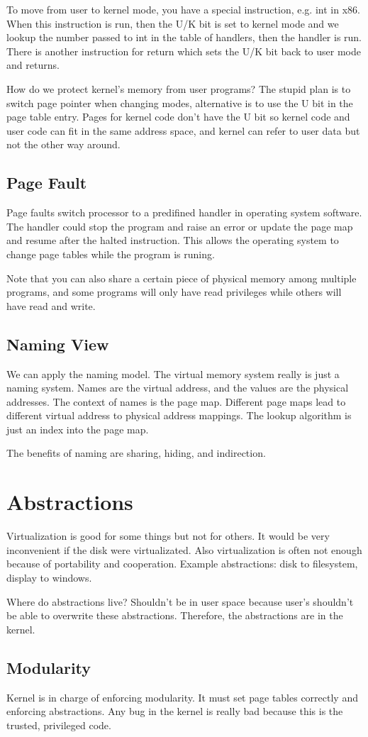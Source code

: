 \documentclass[psamsfonts]{amsart}
\begin{document}
To move from user to kernel mode, you have a special instruction, e.g. int in x86. When this instruction is run, then the U/K bit is set to kernel mode and we lookup the number passed to int in the table of handlers, then the handler is run. There is another instruction for return which sets the U/K bit back to user mode and returns.

How do we protect kernel's memory from user programs? The stupid plan is to switch page pointer when changing modes, alternative is to use the U bit in the page table entry. Pages for kernel code don't have the U bit so kernel code and user code can fit in the same address space, and kernel can refer to user data but not the other way around.

\subsection{Page Fault}

Page faults switch processor to a predifined handler in operating system software. The handler could stop the program and raise an error or update the page map and resume after the halted instruction. This allows the operating system to change page tables while the program is runing.

Note that you can also share a certain piece of physical memory among multiple programs, and some programs will only have read privileges while others will have read and write.

\subsection{Naming View}

We can apply the naming model. The virtual memory system really is just a naming system. Names are the virtual address, and the values are the physical addresses. The context of names is the page map. Different page maps lead to different virtual address to physical address mappings. The lookup algorithm is just an index into the page map. 

The benefits of naming are sharing, hiding, and indirection.

\section{Abstractions}

Virtualization is good for some things but not for others. It would be very inconvenient if the disk were virtualizated. Also virtualization is often not enough because of portability and cooperation. Example abstractions: disk to filesystem, display to windows. 

Where do abstractions live? Shouldn't be in user space because user's shouldn't be able to overwrite these abstractions. Therefore, the abstractions are in the kernel. 

\subsection{Modularity}

Kernel is in charge of enforcing modularity. It must set page tables correctly and enforcing abstractions. Any bug in the kernel is really bad because this is the trusted, privileged code. 
\end{document}
